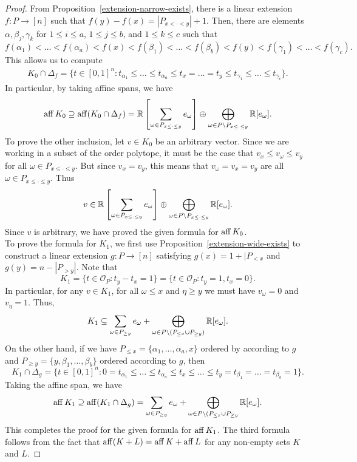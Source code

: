 \documentclass{puthesis-UG}
\begin{document}
\begin{proof}
    From Proposition~\ref{extension-narrow-exists}, there is a linear extension $f : P \to [n]$ such that $f(y) - f(x) = |P_{x < \cdot < y}| + 1$. Then, there are elements $\alpha, \beta_j, \gamma_k$ for $1 \leq i \leq a$, $1 \leq j \leq b$, and $1 \leq k \leq c$ such that 
    \[
        f(\alpha_1) < \ldots < f(\alpha_a) < f(x) < f(\beta_1) < \ldots < f(\beta_b) < f(y) < f(\gamma_1) < \ldots < f(\gamma_c).
     \] 
    This allows us to compute 
    \begin{align*}
        K_0 \cap \Delta_f = \{t \in [0, 1]^n : t_{\alpha_1} \leq \ldots \leq t_{\alpha_a} \leq t_x = \ldots = t_y \leq t_{\gamma_1} \leq \ldots \leq t_{\gamma_c} \}.
    \end{align*}
    In particular, by taking affine spans, we have 
    \[
        \operatorname{aff} K_0 \supseteq \operatorname{aff} (K_0 \cap \Delta_f) = \mathbb{R} \left [\sum_{\omega \in P_{x \leq \cdot \leq y}} e_\omega \right ] \oplus \bigoplus_{\omega \in P \backslash P_{x \leq \cdot \leq y}} \mathbb{R}[e_\omega].
    \]
    To prove the other inclusion, let $v \in K_0$ be an arbitrary vector. Since we are working in a subset of the order polytope, it must be the case that $v_x \leq v_\omega \leq v_y$ for all $\omega \in P_{x \leq \cdot \leq y}$. But since $v_x = v_y$, this means that $v_{\omega} = v_x = v_y$ are all $\omega \in P_{x \leq \cdot \leq y}$. Thus
    \[
        v \in \mathbb{R} \left [ \sum_{\omega \in P_{x \leq \cdot \leq y}} e_\omega \right ] \oplus \bigoplus_{\omega \in P \backslash P_{x \leq \cdot \leq y}} \mathbb{R}[e_\omega].
    \]
    Since $v$ is arbitrary, we have proved the given formula for $\operatorname{aff} K_0$. \\

    To prove the formula for $K_1$, we first use Proposition~\ref{extension-wide-exists} to construct a linear extension $g : P \to [n]$ satisfying $g(x) = 1 + |P_{< x}$ and $g(y) = n - |P_{> y}|$. Note that 
    \[
        K_1 = \{t \in \mathcal{O}_P : t_y - t_x = 1 \} = \{t \in \mathcal{O}_P : t_y = 1, t_x = 0\}.
    \]
    In particular, for any $v \in K_1$, for all $\omega \leq x$ and $\eta \geq y$ we must have $v_\omega = 0$ and $v_\eta = 1$. Thus, 
    \[
        K_1 \subseteq \sum_{\omega \in P_{ \geq y}} e_\omega + \bigoplus_{\omega \in P \backslash (P_{\leq x} \cup P_{\geq y})} \mathbb{R}[e_\omega].
    \]
    On the other hand, if we have $P_{\leq x} = \{\alpha_1, \ldots, \alpha_a, x\}$ ordered by according to $g$ and $P_{\geq y} = \{y, \beta_1, \ldots, \beta_b\}$ ordered according to $g$, then
    \[
        K_1 \cap \Delta_g = \{t \in [0, 1]^n : 0 = t_{\alpha_1} \leq \ldots \leq t_{\alpha_a} \leq t_x \leq \ldots \leq t_y = t_{\beta_1} = \ldots = t_{\beta_b} = 1 \}.
    \]
    Taking the affine span, we have 
    \[
        \operatorname{aff} K_1 \supseteq \operatorname{aff} (K_1 \cap \Delta_g) = \sum_{\omega \in P_{\geq y}} e_{\omega} + \bigoplus_{\omega \in P \backslash (P_{\leq x} \cup P_{\geq y}} \mathbb{R}[e_\omega]. 
    \]
    This completes the proof for the given formula for $\operatorname{aff} K_1$. The third formula follows from the fact that $\operatorname{aff} (K+L) = \operatorname{aff} K + \operatorname{aff} L$ for any non-empty sets $K$ and $L$. 
\end{proof}
\end{document}
